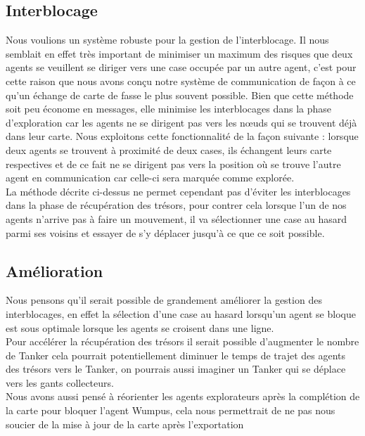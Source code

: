 \documentclass[10pt]{article}
\newcommand\tab[1][0.65cm]{\hspace*{#1}}
\begin{document}
	
\subsection{Interblocage}
\tab Nous voulions un système robuste pour la gestion de l'interblocage. Il nous semblait en effet très important de minimiser un maximum des risques que deux agents se veuillent se diriger vers une case occupée par un autre agent, c'est pour cette raison que nous avons conçu notre système de communication de façon à ce qu'un échange de carte de fasse le plus souvent possible. Bien que cette méthode soit peu économe en messages, elle minimise les interblocages dans la phase d'exploration car les agents ne se dirigent pas vers les n\oe{}uds qui se trouvent déjà dans leur carte. Nous exploitons cette fonctionnalité de la façon suivante : lorsque deux agents se trouvent à proximité de deux cases, ils échangent leurs carte respectives et de ce fait ne se dirigent pas vers la position où se trouve l'autre agent en communication car celle-ci sera marquée comme explorée.\\
\tab La méthode décrite ci-dessus ne permet cependant pas d'éviter les interblocages dans la phase de récupération des trésors, pour contrer cela lorsque l'un de nos agents n'arrive pas à faire un mouvement, il va sélectionner une case au hasard parmi ses voisins et essayer de s'y déplacer jusqu'à ce que ce soit possible.

\subsection{Amélioration}
Nous pensons qu'il serait possible de grandement améliorer la gestion des interblocages, en effet la sélection d'une case au hasard lorsqu'un agent se bloque est sous optimale lorsque les agents se croisent dans une ligne.\\
\tab Pour accélérer la récupération des trésors il serait possible d'augmenter le nombre de Tanker cela pourrait potentiellement diminuer le temps de trajet des agents des trésors vers le Tanker, on pourrais aussi imaginer un Tanker qui se déplace vers les gants collecteurs.\\
\tab Nous avons aussi pensé à réorienter les agents explorateurs après la complétion de la carte pour bloquer l'agent Wumpus, cela nous permettrait de ne pas nous soucier de la mise à jour de la carte après l'exportation\\
\end{document}
